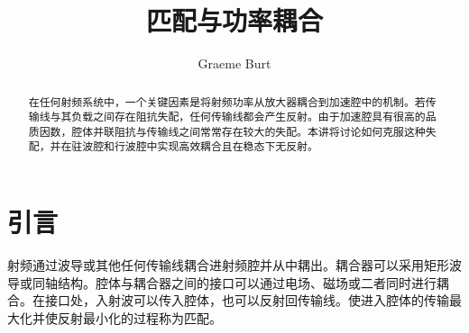 \documentclass{cernyrep}
\begin{document}
\title{匹配与功率耦合}
\author{Graeme Burt}

\begin{abstract}
在任何射频系统中，一个关键因素是将射频功率从放大器耦合到加速腔中的机制。若传输线与其负载之间存在阻抗失配，任何传输线都会产生反射。由于加速腔具有很高的品质因数，腔体并联阻抗与传输线之间常常存在较大的失配。本讲将讨论如何克服这种失配，并在驻波腔和行波腔中实现高效耦合且在稳态下无反射。
\end{abstract}
\maketitle
\thispagestyle{ARTTITLE}

\section{引言}
射频通过波导或其他任何传输线耦合进射频腔并从中耦出。耦合器可以采用矩形波导或同轴结构。腔体与耦合器之间的接口可以通过电场、磁场或二者同时进行耦合。在接口处，入射波可以传入腔体，也可以反射回传输线。使进入腔体的传输最大化并使反射最小化的过程称为匹配。
\end{document}
